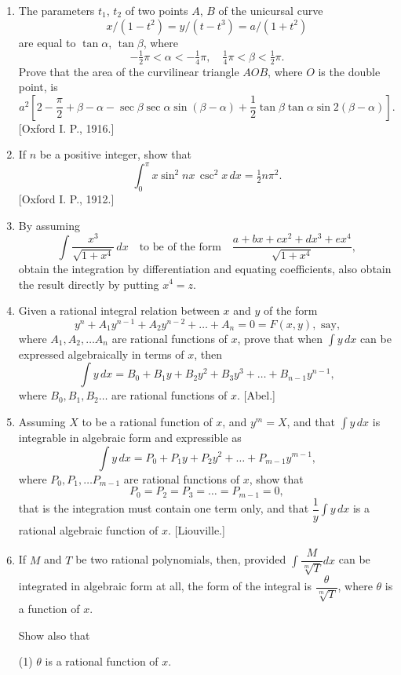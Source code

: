 \documentclass[11pt, a4paper]{article}
\newcommand{\source}[1]{\hfill\textnormal{[#1]}}
\begin{document}
\begin{enumerate}[leftmargin=2em]
\item The parameters $t_1$, $t_2$ of two points $A$, $B$ of the unicursal curve
\[
x/(1-t^2)=y/(t-t^3)=a/(1+t^2)
\]
are equal to $\tan\alpha$, $\tan\beta$, where
\[
-\tfrac12\pi<\alpha<-\tfrac14\pi,\quad \tfrac14\pi<\beta<\tfrac12\pi.
\]
Prove that the area of the curvilinear triangle $AOB$, where $O$ is the double point, is
\[
a^2\left[2-\frac{\pi}{2}+\beta-\alpha-\sec\beta\sec\alpha\sin(\beta-\alpha)+\frac12\tan\beta\tan\alpha\sin2(\beta-\alpha)\right].
\]
\source{Oxford I. P., 1916.}

\item If $n$ be a positive integer, show that
\[
\int_0^\pi x\sin^2nx\,\csc^2x\,dx=\tfrac12n\pi^2.
\]
\source{Oxford I. P., 1912.}

\item By assuming
\[
\int\frac{x^3}{\sqrt{1+x^4}}\,dx\quad\text{to be of the form}\quad\frac{a+bx+cx^2+dx^3+ex^4}{\sqrt{1+x^4}},
\]
obtain the integration by differentiation and equating coefficients, also obtain the result directly by putting $x^4=z$.

\item Given a rational integral relation between $x$ and $y$ of the form
\[
y^n+A_1y^{n-1}+A_2y^{n-2}+\dots+A_n=0=F(x,y),\text{ say,}
\]
where $A_1, A_2,\dots A_n$ are rational functions of $x$, prove that when $\displaystyle\int y\,dx$ can be expressed algebraically in terms of $x$, then
\[
\int y\,dx=B_0+B_1y+B_2y^2+B_3y^3+\dots+B_{n-1}y^{n-1},
\]
where $B_0, B_1, B_2\dots$ are rational functions of $x$. \source{Abel.}

\item Assuming $X$ to be a rational function of $x$, and $y^m=X$, and that $\displaystyle\int y\,dx$ is integrable in algebraic form and expressible as
\[
\int y\,dx=P_0+P_1y+P_2y^2+\dots+P_{m-1}y^{m-1},
\]
where $P_0, P_1,\dots P_{m-1}$ are rational functions of $x$, show that
\[
P_0=P_2=P_3=\dots=P_{m-1}=0,
\]
that is the integration must contain one term only, and that $\dfrac1y\displaystyle\int y\,dx$ is a rational algebraic function of $x$. \source{Liouville.}

\item If $M$ and $T$ be two rational polynomials, then, provided $\displaystyle\int\dfrac{M}{\sqrt[m]{T}}dx$ can be integrated in algebraic form at all, the form of the integral is $\dfrac{\theta}{\sqrt[m]{T}}$, where $\theta$ is a function of $x$.

Show also that

(1) $\theta$ is a rational function of $x$.


\end{enumerate}
\end{document}
